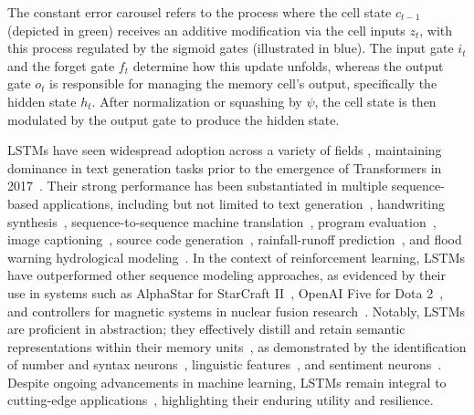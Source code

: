 The constant error carousel refers to the process where the cell state $c_{t-1}$ (depicted in green) receives an additive modification via the cell inputs $z_t$, with this process regulated by the sigmoid gates (illustrated in blue). The input gate $i_t$ and the forget gate $f_t$ determine how this update unfolds, whereas the output gate $o_t$ is responsible for managing the memory cell's output, specifically the hidden state $h_t$. After normalization or squashing by $\psi$, the cell state is then modulated by the output gate to produce the hidden state.

LSTMs have seen widespread adoption across a variety of fields \citep{Hochreiter:01,Hochreiter:07,Schmidhuber:15}, maintaining dominance in text generation tasks prior to the emergence of Transformers in 2017~\citep{Vaswani:17}. Their strong performance has been substantiated in multiple sequence-based applications, including but not limited to text generation~\citep{Graves:13,Karpathy:15blog}, handwriting synthesis~\citep{Graves:13}, sequence-to-sequence machine translation~\citep{Sutskever:14nips}, program evaluation~\citep{Zaremba:14arxiv}, image captioning~\citep{Karpathy:15,Hossain:19}, source code generation~\citep{Karpathy:15blog}, rainfall-runoff prediction~\citep{Kratzert:18,Kratzert:19}, and flood warning hydrological modeling~\citep{Nearing:24}. In the context of reinforcement learning, LSTMs have outperformed other sequence modeling approaches, as evidenced by their use in systems such as AlphaStar for StarCraft II~\citep{Vinyals:17short}, OpenAI Five for Dota 2~\citep{OpenAI:19}, and controllers for magnetic systems in nuclear fusion research~\citep{Degrave:22short}. Notably, LSTMs are proficient in abstraction; they effectively distill and retain semantic representations within their memory units~\citep{Karpathy:15blog}, as demonstrated by the identification of number and syntax neurons~\citep{Lakretz:19}, linguistic features~\citep{Bau:19}, and sentiment neurons~\citep{Radford:17arxiv}. Despite ongoing advancements in machine learning, LSTMs remain integral to cutting-edge applications~\citep{Degrave:22short,Nearing:24}, highlighting their enduring utility and resilience.

